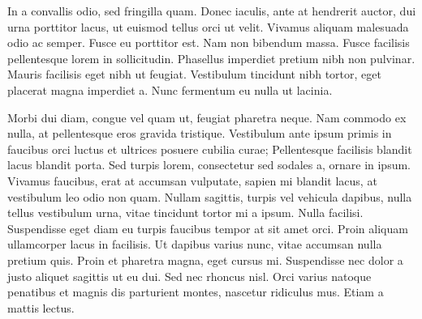 \documentclass{article}
\begin{document}
In a convallis odio, sed fringilla quam. Donec iaculis, ante at hendrerit
auctor, dui urna porttitor lacus, ut euismod tellus orci ut velit. Vivamus
aliquam malesuada odio ac semper. Fusce eu porttitor est. Nam non bibendum
massa. Fusce facilisis pellentesque lorem in sollicitudin. Phasellus imperdiet
pretium nibh non pulvinar. Mauris facilisis eget nibh ut feugiat. Vestibulum
tincidunt nibh tortor, eget placerat magna imperdiet a. Nunc fermentum eu nulla
ut lacinia.

Morbi dui diam, congue vel quam ut, feugiat pharetra neque. Nam commodo ex
nulla, at pellentesque eros gravida tristique. Vestibulum ante ipsum primis in
faucibus orci luctus et ultrices posuere cubilia curae; Pellentesque facilisis
blandit lacus blandit porta. Sed turpis lorem, consectetur sed sodales a, ornare
in ipsum. Vivamus faucibus, erat at accumsan vulputate, sapien mi blandit lacus,
at vestibulum leo odio non quam. Nullam sagittis, turpis vel vehicula dapibus,
nulla tellus vestibulum urna, vitae tincidunt tortor mi a ipsum. Nulla facilisi.
Suspendisse eget diam eu turpis faucibus tempor at sit amet orci. Proin aliquam
ullamcorper lacus in facilisis. Ut dapibus varius nunc, vitae accumsan nulla
pretium quis. Proin et pharetra magna, eget cursus mi. Suspendisse nec dolor a
justo aliquet sagittis ut eu dui. Sed nec rhoncus nisl. Orci varius natoque
penatibus et magnis dis parturient montes, nascetur ridiculus mus. Etiam a
mattis lectus.
\end{document}
